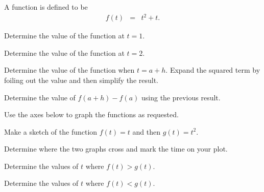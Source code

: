 
\begin{problem}
\item A function is defined to be
  \begin{eqnarray*}
    f(t) & = & t^2 + t.
  \end{eqnarray*}
  \begin{subproblem}
  \item Determine the value of the function at $t=1$.
    \vfill
  \item Determine the value of the function at $t=2$.
    \vfill
  \item Determine the value of the function when $t=a+h$. Expand the
    squared term by foiling out the value and then simplify the
    result.
    \vfill
  \item Determine the value of $f(a+h)-f(a)$ using the previous
    result.
    \vfill
  \end{subproblem}

  \clearpage

\item Use the axes below to graph the functions as requested.

  \scalebox{0.7}{}

  \begin{subproblem}
  \item Make a sketch of the function $f(t)=t$ and then $g(t)=t^2$.
  \item Determine where the two graphs cross and mark the time on your
    plot.
    \clearpage
  \item Determine the values of $t$ where $f(t)>g(t)$. 
    \vfill
  \item Determine the values of $t$ where $f(t)<g(t)$.
    \vfill
  \end{subproblem}


\end{problem}


